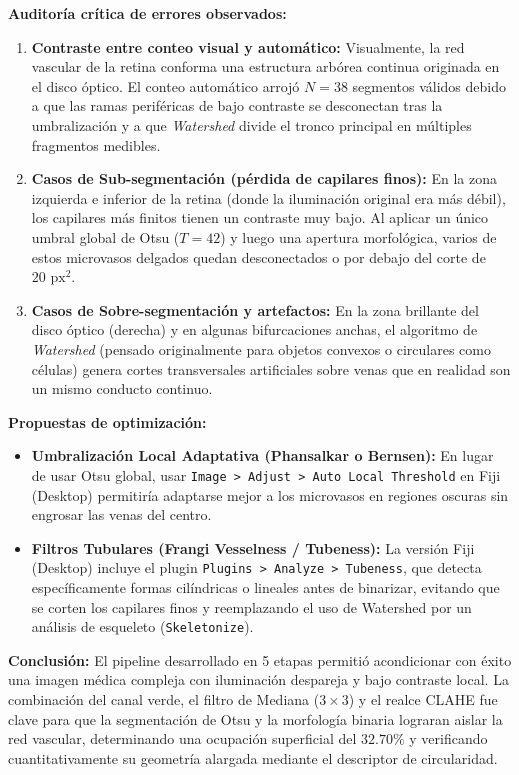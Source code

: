 \documentclass[11pt,a4paper]{article}
\begin{document}
\textbf{Auditoría crítica de errores observados:}
\begin{enumerate}
    \item \textbf{Contraste entre conteo visual y automático:} Visualmente, la red vascular de la retina conforma una estructura arbórea continua originada en el disco óptico. El conteo automático arrojó $N = 38$ segmentos válidos debido a que las ramas periféricas de bajo contraste se desconectan tras la umbralización y a que \textit{Watershed} divide el tronco principal en múltiples fragmentos medibles.
    \item \textbf{Casos de Sub-segmentación (pérdida de capilares finos):} En la zona izquierda e inferior de la retina (donde la iluminación original era más débil), los capilares más finitos tienen un contraste muy bajo. Al aplicar un único umbral global de Otsu ($T=42$) y luego una apertura morfológica, varios de estos microvasos delgados quedan desconectados o por debajo del corte de $20\text{ px}^2$.
    \item \textbf{Casos de Sobre-segmentación y artefactos:} En la zona brillante del disco óptico (derecha) y en algunas bifurcaciones anchas, el algoritmo de \textit{Watershed} (pensado originalmente para objetos convexos o circulares como células) genera cortes transversales artificiales sobre venas que en realidad son un mismo conducto continuo.
\end{enumerate}

\textbf{Propuestas de optimización:}
\begin{itemize}
    \item \textbf{Umbralización Local Adaptativa (Phansalkar o Bernsen):} En lugar de usar Otsu global, usar \texttt{Image > Adjust > Auto Local Threshold} en Fiji (Desktop) permitiría adaptarse mejor a los microvasos en regiones oscuras sin engrosar las venas del centro.
    \item \textbf{Filtros Tubulares (Frangi Vesselness / Tubeness):} La versión Fiji (Desktop) incluye el plugin \texttt{Plugins > Analyze > Tubeness}, que detecta específicamente formas cilíndricas o lineales antes de binarizar, evitando que se corten los capilares finos y reemplazando el uso de Watershed por un análisis de esqueleto (\texttt{Skeletonize}).
\end{itemize}

\textbf{Conclusión:}
El pipeline desarrollado en 5 etapas permitió acondicionar con éxito una imagen médica compleja con iluminación despareja y bajo contraste local. La combinación del canal verde, el filtro de Mediana ($3\times 3$) y el realce CLAHE fue clave para que la segmentación de Otsu y la morfología binaria lograran aislar la red vascular, determinando una ocupación superficial del $32.70\%$ y verificando cuantitativamente su geometría alargada mediante el descriptor de circularidad.
\end{document}
